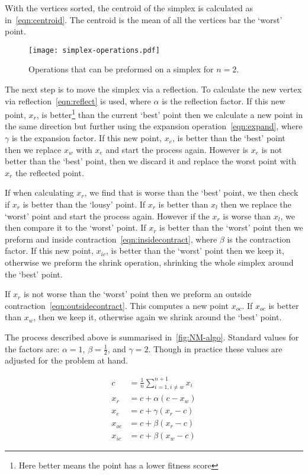 With the vertices sorted, the centroid of the simplex is calculated as in~\cref{eqn:centroid}.
The centroid is the mean of all the vertices bar the `worst' point.

\begin{figure}[!htbp]
    \centering
    \texttt{[image: simplex-operations.pdf]}
    \caption{Operations that can be preformed on a simplex for $n=2$.}
    \label{fig:NM-operations}
\end{figure}

The next step is to move the simplex via a reflection.
To calculate the new vertex via reflection~\cref{eqn:reflect} is used, where $\alpha$ is the reflection factor.
If this new point, $x_r$, is better\footnote{Here better means the point has a lower fitness score} than the current `best' point then we calculate a new point in the same direction but further using the expansion operation~\cref{eqn:expand}, where $\gamma$ is the expansion factor.
If this new point, $x_e$, is better than the `best' point then we replace $x_w$ with $x_e$ and start the process again.
However is $x_e$ is not better than the `best' point, then we discard it and replace the worst point with $x_r$ the reflected point.

If when calculating $x_r$, we find that is worse than the `best' point, we then check if $x_r$ is better than the `lousy' point.
If $x_r$ is better than $x_l$ then we replace the `worst' point and start the process again.
However if the $x_r$ is worse than $x_l$, we then compare it to the `worst' point.
If $x_r$ is better than the `worst' point then we preform and inside contraction~\cref{eqn:insidecontract}, where $\beta$ is the contraction factor.
If this new point, $x_{ic}$, is better than the `worst' point then we keep it, otherwise we preform the shrink operation, shrinking the whole simplex around the `best' point.

If $x_r$ is not worse than the `worst' point then we preform an outside contraction~\cref{eqn:outsidecontract}.
This computes a new point $x_{oc}$.
If $x_{oc}$ is better than $x_w$, then we keep it, otherwise again we shrink around the `best' point.

The process described above is summarised in~\cref{fig:NM-algo}.
Standard values for the factors are: $\alpha=1$, $\beta=\frac{1}{2}$, and $\gamma=2$.
Though in practice these values are adjusted for the problem at hand.

\begin{align}
c &= \frac{1}{n}\sum \limits_{i=1,i\neq w}^{n+1} x_i \label{eqn:centroid}\\
x_r &= c + \alpha(c - x_w)\label{eqn:reflect}\\
x_e &= c + \gamma(x_r - c)\label{eqn:expand}\\
x_{oc} &= c + \beta(x_r - c)\label{eqn:outsidecontract}\\
x_{ic} &= c + \beta(x_w - c)\label{eqn:insidecontract}
\end{align}

